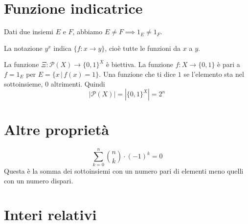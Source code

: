 \documentclass[a4paper]{article}
\begin{document}
\pagebreak




\section{Funzione indicatrice}


Dati due insiemi \(E\) e \(F\), abbiamo \(E \neq F \implies 1_E \neq 1_F\).

La notazione \(y^x\) indica \(\{ f\colon x \to y \}\), cioè tutte le funzioni da \(x\) a \(y\).

La funzione \(\Xi \colon \mathcal{P}(X) \to {\{ 0,1 \}}^X\)
è biettiva. La funzione \(f\colon X \to \{0,1\}\) è pari a \(f=1_E\) per
\(E = \{ x \,|\, f(x)=1 \}\).
Una funzione che ti dice \(1\) se l'elemento sta nel sottoinsieme, 0 altrimenti.
Quindi \[ |\mathcal{P}(X)| = |{\{0,1\}}^X| = 2^n \]

\section{Altre proprietà}

\[
    \sum_{k=0}^n \binom{n}{k}\cdot {(-1)}^k = 0
\]
Questa è la somma dei sottoinsiemi con un numero pari di elementi meno quelli con un numero dispari.

\pagebreak

\section{Interi relativi}
\end{document}
